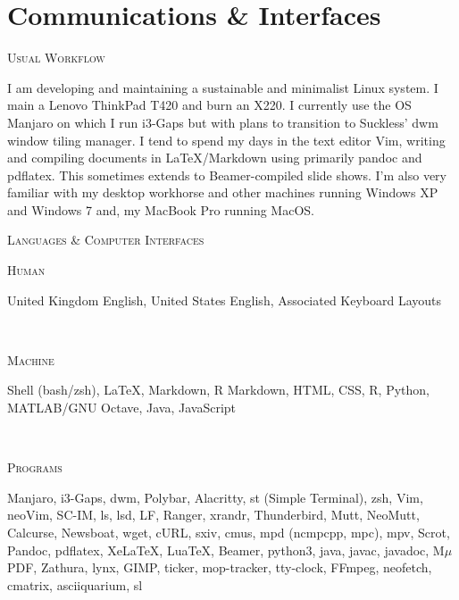 \documentclass[11pt, english]{article}
\begin{document}
{\section{Communications \& Interfaces}

\begin{center}
	\textsc{Usual Workflow}
\end{center}

I am developing and maintaining a sustainable and minimalist Linux system. I main a Lenovo ThinkPad T420 and burn an X220. I currently use the OS Manjaro on which I run i3-Gaps but with plans to transition to Suckless' dwm window tiling manager. I tend to spend my days in the text editor Vim, writing and compiling documents in {\LaTeX}/Markdown using primarily pandoc and pdflatex. This sometimes extends to Beamer-compiled slide shows. I'm also very familiar with my desktop workhorse and other machines running Windows XP and Windows 7 and, my MacBook Pro running MacOS.

\begin{center}
	\textsc{Languages \& Computer Interfaces}
\end{center}

\begin{minipage}[t]{.15\linewidth}
        \hfill                  
        \textsc{Human}
\end{minipage}
\hfill\vline\hfill
\begin{minipage}[t]{.80\linewidth}
	United Kingdom English, United States English, Associated Keyboard Layouts
\end{minipage}\\

\begin{minipage}[t]{.15\linewidth}
        \hfill                  
        \textsc{Machine}
\end{minipage}
\hfill\vline\hfill
\begin{minipage}[t]{.80\linewidth}
	Shell (bash/zsh), {\LaTeX}, Markdown, R Markdown, HTML, CSS, R, Python, MATLAB/GNU Octave, Java, JavaScript
\end{minipage}\\

\begin{minipage}[t]{.15\linewidth}
        \hfill                  
        \textsc{Programs}    
\end{minipage}
\hfill\vline\hfill
\begin{minipage}[t]{.80\linewidth}
	Manjaro, i3-Gaps, dwm, Polybar, Alacritty, st (Simple Terminal), zsh, Vim, neoVim, SC-IM, ls, lsd, LF, Ranger, xrandr, Thunderbird, Mutt, NeoMutt, Calcurse, Newsboat, wget, cURL, sxiv, cmus, mpd (ncmpcpp, mpc), mpv, Scrot, Pandoc, pdflatex, XeLaTeX, LuaTeX, Beamer, python3, java, javac, javadoc, M$\mu$PDF, Zathura, lynx, GIMP, ticker, mop-tracker, tty-clock, FFmpeg, neofetch, cmatrix, asciiquarium, sl
\end{minipage}\\

}
\end{document}
